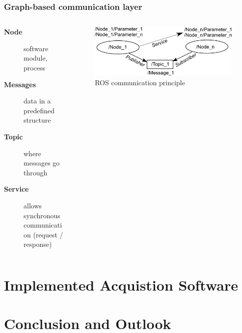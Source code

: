 \documentclass[aspectratio=169]{beamer}
\begin{document}
  \begin{frame}
   \frametitle{Graph-based communication layer}
   \begin{columns}[onlytextwidth]
    \begin{column}{0.5\textwidth}
    
      \begin{description}
       \item [\textbf{Node}] software module, process
       \item [\textbf{Messages}] data in a predefined structure
       \item [\textbf{Topic}] where messages go through
       \item [\textbf{Service}] allows synchronous communication (request / response)
      \end{description}
       
    \end{column}
    \begin{column}{0.5\textwidth}

    \begin{figure}[h]
      \centering
      \includegraphics[width=\textwidth]{./Abbildungen/ROS-Graph-basic.png}
      \caption{ROS communication principle}
      \label{abb:graph}
    \end{figure}
    \end{column}
   \end{columns}
  \end{frame}

\section{Implemented Acquistion Software}

\section{Conclusion and Outlook}
\end{document}
